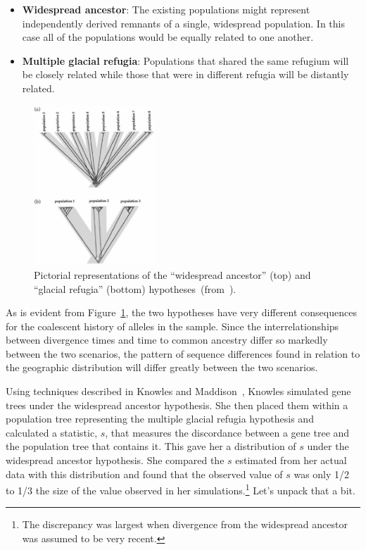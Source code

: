 \documentclass[12pt]{article}
\begin{document}
\begin{itemize}

\item {\bf Widespread ancestor}: The existing populations might represent
  independently derived remnants of a single, widespread
  population. In this case all of the populations would be equally
  related to one another.

\item {\bf Multiple glacial refugia}: Populations that shared the same
  refugium will be closely related while those that were in different
  refugia will be distantly related.

\end{itemize}

\begin{figure}
\begin{center}
\includegraphics[height=6cm]{divergence-hypotheses.eps}
\end{center}
\caption{Pictorial representations of the ``widespread ancestor''
  (top) and ``glacial refugia'' (bottom)
  hypotheses~(from~\cite{Knowles-2001}).}\label{fig:divergence-hypotheses}
\end{figure}

As is evident from Figure~\ref{fig:divergence-hypotheses}, the two
hypotheses have very different consequences for the coalescent history
of alleles in the sample. Since the interrelationships between
divergence times and time to common ancestry differ so markedly
between the two scenarios, the pattern of sequence differences found
in relation to the geographic distribution will differ greatly between
the two scenarios. 

Using techniques described in Knowles and
Maddison~\cite{Knowles-Maddison-2002}, Knowles simulated gene trees
under the widespread ancestor hypothesis. She then placed them within
a population tree representing the multiple glacial refugia hypothesis
and calculated a statistic, $s$, that measures the discordance between
a gene tree and the population tree that contains it. This gave her a
distribution of $s$ under the widespread ancestor hypothesis. She
compared the $s$ estimated from her actual data with this distribution
and found that the observed value of $s$ was only 1/2 to 1/3 the size
of the value observed in her simulations.\footnote{The discrepancy was
  largest when divergence from the widespread ancestor was assumed to
  be very recent.} Let's unpack that a bit. 
\end{document}
